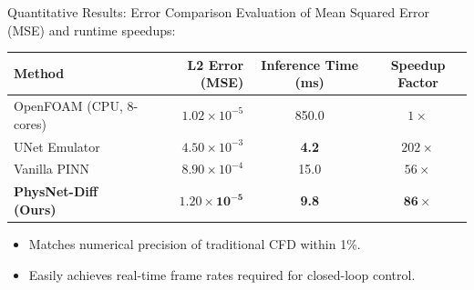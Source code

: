 \documentclass[aspectratio=169,10pt]{beamer}
\begin{document}
\begin{frame}{Quantitative Results: Error Comparison}
  Evaluation of Mean Squared Error (MSE) and runtime speedups:
  \vspace{0.4cm}
  
  \begin{tabularx}{\linewidth}{@{}>{\raggedright\arraybackslash}X r c c@{}}
    \toprule
    \textbf{Method} & \textbf{L2 Error (MSE)} & \textbf{Inference Time (ms)} & \textbf{Speedup Factor} \\
    \midrule
    OpenFOAM (CPU, 8-cores) & $1.02 \times 10^{-5}$ & 850.0 & $1\times$ \\
    UNet Emulator & $4.50 \times 10^{-3}$ & \textbf{4.2} & $202\times$ \\
    Vanilla PINN & $8.90 \times 10^{-4}$ & 15.0 & $56\times$ \\
    \midrule
    \textbf{PhysNet-Diff (Ours)} & $\mathbf{1.20 \times 10^{-5}}$ & \textbf{9.8} & $\mathbf{86\times}$ \\
    \bottomrule
  \end{tabularx}
  \vspace{0.4cm}
  \begin{itemize}
    \item Matches numerical precision of traditional CFD within 1\%.
    \item Easily achieves real-time frame rates required for closed-loop control.
  \end{itemize}
\end{frame}
\end{document}
